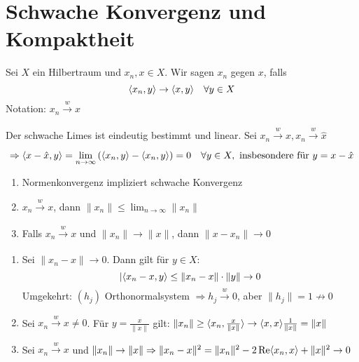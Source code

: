 


\section{Schwache Konvergenz und Kompaktheit}


\begin{definition}
	Sei $X$ ein Hilbertraum und $x_{n}, x \in X$. Wir sagen $x_{n}$  gegen $x$, falls
		\[ \langle x_{n} , y \rangle \rightarrow \langle x , y \rangle \quad \forall y \in X \]
	Notation: $x_{n} \xrightarrow[]{w} x$	
\end{definition}


\begin{bemerkung}
	Der schwache Limes ist eindeutig bestimmt und linear. Sei $x_{n} \xrightarrow[]{w} x, x_{n} \xrightarrow[]{w} \hat{x}$
		\[ \Rightarrow \langle x - \hat{x} , y \rangle = \lim_{n \rightarrow \infty} \left( \langle x_{n} , y \rangle - \langle x_{n} , y \rangle \right) = 0 \quad \forall y \in X, \text{ insbesondere für } y = x - \hat{x} \]	
\end{bemerkung}


\begin{prop} \label{prop:18.3}
	\begin{enumerate}[label=\alph*\upshape)]
		\item Normenkonvergenz impliziert schwache Konvergenz
		\item $x_{n} \xrightarrow[]{w} x$, dann $\| x_{n} \| \leq \lim_{n \rightarrow \infty} \| x_{n} \|$
		\item Falls $x_{n} \xrightarrow[]{w} x$ und $\| x_{n} \| \rightarrow \| x \|$, dann $\| x - x_{n} \| \rightarrow 0$
	\end{enumerate}
\end{prop}

\begin{beweis}
	\begin{enumerate}[label=\alph*\upshape)]
		\item Sei $\| x_{n} - x \| \rightarrow 0$. Dann gilt für $y \in X$:
			\[ |\langle x_{n} - x , y \rangle \leq \| x_{n} - x \| \cdot \| y \| \rightarrow 0 \]
			Umgekehrt: $(h_{j})$ Orthonormalsystem $\Rightarrow h_{j} \xrightarrow[]{w} 0$, aber $\| h_{j} \| = 1 \not\rightarrow 0$
		\item Sei $x_{n} \xrightarrow[]{w} x \neq 0$. Für $y = \frac{x}{\| x \|}$ gilt: $\| x_{n} \| \geq \langle x_{n} , \frac{x}{\| x \|} \rangle \rightarrow \langle x , x \rangle \frac{1}{\| x \|} = \| x \|$
		\item Sei $x_{n} \xrightarrow[]{w} x$ und $\| x_{n} \| \rightarrow \| x \| \Rightarrow \| x_{n} - x \|^{2} = \| x_{n} \|^{2} - 2 \mathop{\rm Re}\nolimits \langle x_{n} , x \rangle + \| x \|^{2} \rightarrow 0$
	\end{enumerate}	
\end{beweis}


